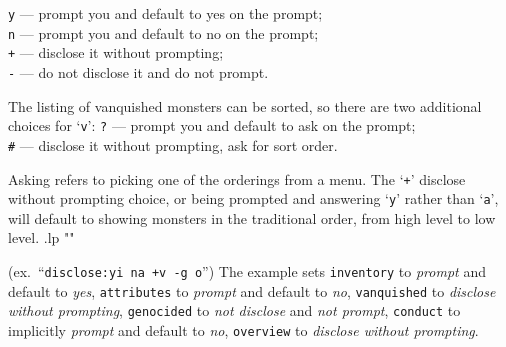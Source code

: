 {\tt y} --- prompt you and default to yes on the prompt;\\
{\tt n} --- prompt you and default to no on the prompt;\\
{\tt +} --- disclose it without prompting;\\
{\tt -} --- do not disclose it and do not prompt.

The listing of vanquished monsters can be sorted,
so there are two additional choices for `{\tt v}':
{\tt ?} --- prompt you and default to ask on the prompt;\\
{\tt\#} --- disclose it without prompting, ask for sort order.

Asking refers to picking one of the orderings from a menu.
The `{\tt +}' disclose without prompting choice,
or being prompted and answering `{\tt y}' rather than `{\tt a}',
will default to showing monsters in the traditional order,
from high level to low level.
.lp ""

(ex.\ ``{\tt disclose:yi na +v -g o}'')
The example sets
{\tt inventory} to {\it prompt\/} and default to {\it yes\/},
{\tt attributes} to {\it prompt\/} and default to {\it no\/},
{\tt vanquished} to {\it disclose without prompting\/},
{\tt genocided} to {\it not disclose\/} and {\it not prompt\/},
{\tt conduct} to implicitly {\it prompt\/} and default to {\it no\/},
{\tt overview} to {\it disclose without prompting\/}.

